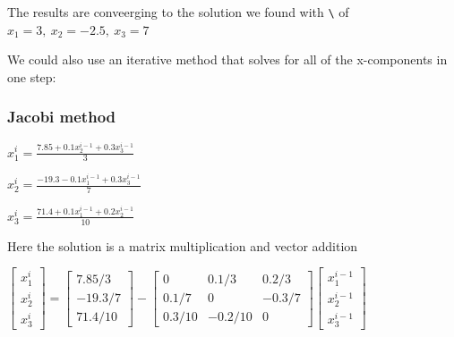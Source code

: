 \documentclass[11pt]{article}
\begin{document}
The results are conveerging to the solution we found with
\texttt{\textbackslash{}} of $x_{1}=3,~x_{2}=-2.5,~x_{3}=7$

We could also use an iterative method that solves for all of the
x-components in one step:

\subsubsection{Jacobi method}\label{jacobi-method}

$x_{1}^{i}=\frac{7.85+0.1x_{2}^{i-1}+0.3x_{3}^{i-1}}{3}$

$x_{2}^{i}=\frac{-19.3-0.1x_{1}^{i-1}+0.3x_{3}^{i-1}}{7}$

$x_{3}^{i}=\frac{71.4+0.1x_{1}^{i-1}+0.2x_{2}^{i-1}}{10}$

Here the solution is a matrix multiplication and vector addition

$\left[ \begin{array}{c} x_{1}^{i} \\ x_{2}^{i} \\ x_{3}^{i} \end{array} \right]= \left[ \begin{array}{c} 7.85/3 \\ -19.3/7 \\ 71.4/10\end{array} \right]- \left[ \begin{array}{ccc} 0 & 0.1/3 & 0.2/3 \\ 0.1/7 & 0 & -0.3/7 \\ 0.3/10 & -0.2/10 & 0 \end{array} \right] \left[ \begin{array}{c} x_{1}^{i-1} \\ x_{2}^{i-1} \\ x_{3}^{i-1} \end{array} \right]$
\end{document}
